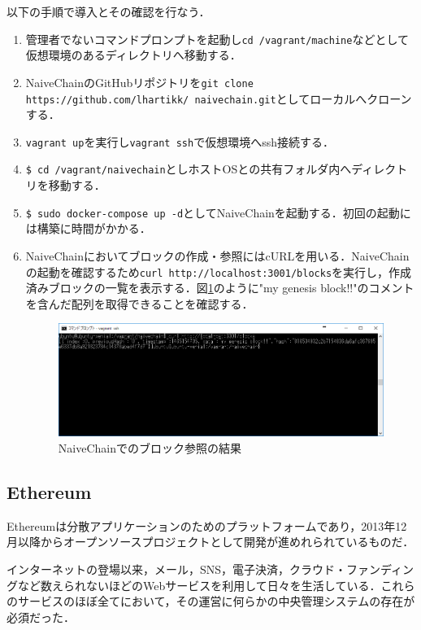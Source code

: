 以下の手順で導入とその確認を行なう．

\begin{enumerate}
\item 管理者でないコマンドプロンプトを起動し\texttt{cd /vagrant/machine}などとして仮想環境のあるディレクトリへ移動する．
\item NaiveChainのGitHubリポジトリを\texttt{git clone https://github.com/lhartikk/
naivechain.git}としてローカルへクローンする．
\item \texttt{vagrant up}を実行し\texttt{vagrant ssh}で仮想環境へssh接続する．
\item \texttt{\$ cd /vagrant/naivechain}としホストOSとの共有フォルダ内へディレクトリを移動する．
\item \texttt{\$ sudo docker-compose up -d}としてNaiveChainを起動する．初回の起動には構築に時間がかかる．
\item NaiveChainにおいてブロックの作成・参照にはcURLを用いる．NaiveChainの起動を確認するため\texttt{curl http://localhost:3001/blocks}を実行し，作成済みブロックの一覧を表示する．図\ref{3001blocks}のように"my genesis block!!"のコメントを含んだ配列を取得できることを確認する．
\begin{figure}[htb]
\centering
\includegraphics[width=12cm]{images/3001blocks.png}
\caption{NaiveChainでのブロック参照の結果}\label{3001blocks}
\end{figure}
\newpage
\end{enumerate}

\newpage

\subsection{Ethereum}
Ethereum\cite{ethereum}は分散アプリケーションのためのプラットフォームであり，2013年12月以降からオープンソースプロジェクトとして開発が進めれられているものだ．

インターネットの登場以来，メール，SNS，電子決済，クラウド・ファンディングなど数えられないほどのWebサービスを利用して日々を生活している．これらのサービスのほぼ全てにおいて，その運営に何らかの中央管理システムの存在が必須だった．

